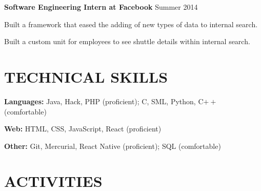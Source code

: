 \documentclass[margin, 11pt]{res} %
\begin{document}
\begin{resume}
\vspace{3pt}

{\bf Software Engineering Intern at Facebook} \hfill {\small Summer 2014}

\begin{itemize} \itemsep -2pt
{\small
\item Built a framework that eased the adding of new types of data to internal search.
\item Built a custom unit for employees to see shuttle details within internal search.
}
\end{itemize}




\section{TECHNICAL SKILLS}

{\bf Languages:}
Java, Hack, PHP (proficient); C, SML, Python, C$++$ (comfortable)

\vspace{5pt}

{\bf Web:}
HTML, CSS, JavaScript, React (proficient)

\vspace{5pt}

{\bf Other:}
Git, Mercurial, React Native (proficient); SQL (comfortable)


\section{ACTIVITIES}


\end{resume}
\end{document}

